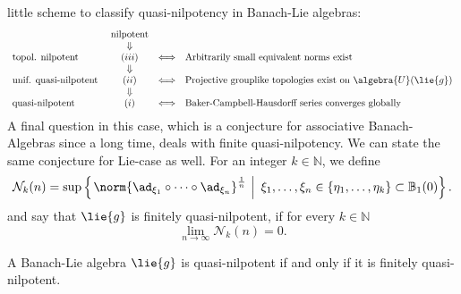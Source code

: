 \documentclass[
11pt,                          %
english                        %
]{article}
\begin{document}
little scheme to classify quasi-nilpotency in Banach-Lie algebras:
\begin{equation}
	\label{classification}
	\begin{array}{lccl}
		& \text{nilpotent} &
		\\
		& \Downarrow &
		\\
		\text{topol. nilpotent } &
		(iii) & \Longleftrightarrow &
		\text{Arbitrarily small equivalent norms exist}
		\\
		& \Downarrow &
		\\
		\text{unif. quasi-nilpotent } &
		(ii) & \Longleftrightarrow &
		\text{Projective grouplike topologies exist on }
		\algebra{U}(\lie{g})
		\\
		& \Downarrow &
		\\
		\text{quasi-nilpotent } &
		(i) & \Longleftrightarrow &
		\text{Baker-Campbell-Hausdorff series converges globally}
	\end{array}
\end{equation}
A final question in this case, which is a conjecture for associative Banach-Algebras 
since a long time, deals with finite quasi-nilpotency. We can state the same 
conjecture for Lie-case as well. For an integer $k \in \mathbb{N}$, we define
\begin{equation}
	\mathcal{N}_k(n)
	=
	\sup \left\{ 
	\left.
		\norm{ \ad_{\xi_1} \circ \cdots \circ \ad_{\xi_n} }^{\frac{1}{n}} 
	\ \right| \
		\xi_1, \ldots, \xi_n 
		\in 
		\{\eta_1, \ldots, \eta_k \}
		\subset 
		\mathbb{B}_1(0)
	\right\}.
\end{equation}
and say that $\lie{g}$ is finitely quasi-nilpotent, if for every $k \in \mathbb{N}$
\begin{equation}
	\lim\limits_{n \rightarrow \infty}
	\mathcal{N}_k(n)
	=
	0.
\end{equation}
\begin{conjecture}
	A Banach-Lie algebra $\lie{g}$ is quasi-nilpotent if and only if it is finitely 
	quasi-nilpotent.
\end{conjecture}
\end{document}
